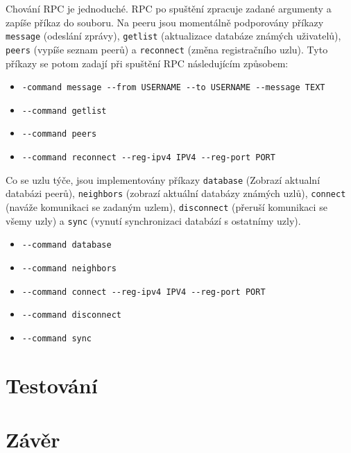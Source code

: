 \documentclass[11pt,a4paper,titlepage]{article}
\begin{document}
            Chování RPC je jednoduché. RPC po spuštění zpracuje zadané argumenty a zapíše příkaz do souboru. Na peeru jsou momentálně podporovány
            příkazy \texttt{message} (odeslání zprávy), \texttt{getlist} (aktualizace databáze známých uživatelů),
            \texttt{peers} (vypíše seznam peerů) a \texttt{reconnect} (změna registračního uzlu).
            Tyto příkazy se potom zadají při spuštění RPC následujícím způsobem:
            \begin{itemize}
                \item \verb+-command message --from USERNAME --to USERNAME --message TEXT+
                \item \verb+--command getlist+
                \item \verb+--command peers+
                \item \verb+--command reconnect --reg-ipv4 IPV4 --reg-port PORT+
            \end{itemize}

            Co se uzlu týče, jsou implementovány příkazy \texttt{database} (Zobrazí aktualní databázi peerů),
            \texttt{neighbors} (zobrazí aktuální databázy známých uzlů), \texttt{connect} (naváže komunikaci se zadaným uzlem),
            \texttt{disconnect} (přeruší komunikaci se všemy uzly) a \texttt{sync} (vynutí synchronizaci databází s ostatnímy uzly).
            \begin{itemize}
                \item \verb+--command database+
                \item \verb+--command neighbors+
                \item \verb+--command connect --reg-ipv4 IPV4 --reg-port PORT+
                \item \verb+--command disconnect+
                \item \verb+--command sync+
            \end{itemize}

    \section{Testování}
    \section{Závěr}
\end{document}
